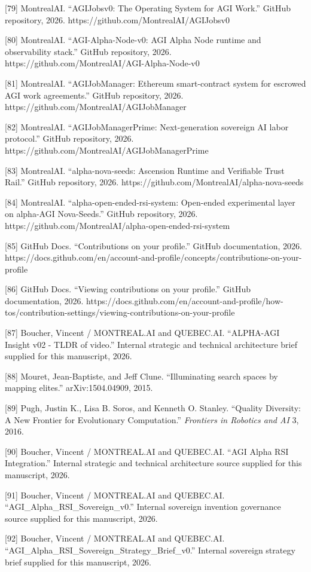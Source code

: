 {[}79{]} MontrealAI. ``AGIJobsv0: The Operating System for AGI Work.''
GitHub repository, 2026. https://github.com/MontrealAI/AGIJobsv0

{[}80{]} MontrealAI. ``AGI-Alpha-Node-v0: AGI Alpha Node runtime and
observability stack.'' GitHub repository, 2026.
https://github.com/MontrealAI/AGI-Alpha-Node-v0

{[}81{]} MontrealAI. ``AGIJobManager: Ethereum smart-contract system for
escrowed AGI work agreements.'' GitHub repository, 2026.
https://github.com/MontrealAI/AGIJobManager

{[}82{]} MontrealAI. ``AGIJobManagerPrime: Next-generation sovereign AI
labor protocol.'' GitHub repository, 2026.
https://github.com/MontrealAI/AGIJobManagerPrime

{[}83{]} MontrealAI. ``alpha-nova-seeds: Ascension Runtime and
Verifiable Trust Rail.'' GitHub repository, 2026.
https://github.com/MontrealAI/alpha-nova-seeds

{[}84{]} MontrealAI. ``alpha-open-ended-rsi-system: Open-ended
experimental layer on alpha-AGI Nova-Seeds.'' GitHub repository, 2026.
https://github.com/MontrealAI/alpha-open-ended-rsi-system

{[}85{]} GitHub Docs. ``Contributions on your profile.'' GitHub
documentation, 2026.
https://docs.github.com/en/account-and-profile/concepts/contributions-on-your-profile

{[}86{]} GitHub Docs. ``Viewing contributions on your profile.'' GitHub
documentation, 2026.
https://docs.github.com/en/account-and-profile/how-tos/contribution-settings/viewing-contributions-on-your-profile

{[}87{]} Boucher, Vincent / MONTREAL.AI and QUEBEC.AI. ``ALPHA-AGI
Insight v02 - TLDR of video.'' Internal strategic and technical
architecture brief supplied for this manuscript, 2026.

{[}88{]} Mouret, Jean-Baptiste, and Jeff Clune. ``Illuminating search
spaces by mapping elites.'' arXiv:1504.04909, 2015.

{[}89{]} Pugh, Justin K., Lisa B. Soros, and Kenneth O. Stanley.
``Quality Diversity: A New Frontier for Evolutionary Computation.''
\emph{Frontiers in Robotics and AI} 3, 2016.

{[}90{]} Boucher, Vincent / MONTREAL.AI and QUEBEC.AI. ``AGI Alpha RSI
Integration.'' Internal strategic and technical architecture source
supplied for this manuscript, 2026.

{[}91{]} Boucher, Vincent / MONTREAL.AI and QUEBEC.AI.
``AGI\_Alpha\_RSI\_Sovereign\_v0.'' Internal sovereign invention
governance source supplied for this manuscript, 2026.

{[}92{]} Boucher, Vincent / MONTREAL.AI and QUEBEC.AI.
``AGI\_Alpha\_RSI\_Sovereign\_Strategy\_Brief\_v0.'' Internal sovereign
strategy brief supplied for this manuscript, 2026.
